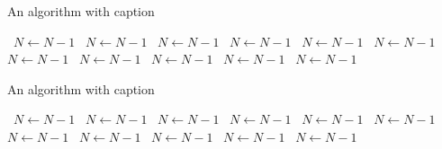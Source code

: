 \documentclass[a4paper]{article}
\begin{document}
\begin{algorithm}
\caption{An algorithm with caption}
\begin{algorithmic}
\    \State $N \gets N - 1$
\    \State $N \gets N - 1$
\    \State $N \gets N - 1$
\    \State $N \gets N - 1$
\    \State $N \gets N - 1$
\    \State $N \gets N - 1$
\    \State $N \gets N - 1$
\    \State $N \gets N - 1$
\    \State $N \gets N - 1$
\    \State $N \gets N - 1$
\    \State $N \gets N - 1$
\EndWhile
\end{algorithmic}
\end{algorithm}

\begin{algorithm}
\caption{An algorithm with caption}
\begin{algorithmic}
\    \State $N \gets N - 1$
\    \State $N \gets N - 1$
\    \State $N \gets N - 1$
\    \State $N \gets N - 1$
\    \State $N \gets N - 1$
\    \State $N \gets N - 1$
\    \State $N \gets N - 1$
\    \State $N \gets N - 1$
\    \State $N \gets N - 1$
\    \State $N \gets N - 1$
\    \State $N \gets N - 1$
\EndWhile
\end{algorithmic}
\end{algorithm}
\end{document}
